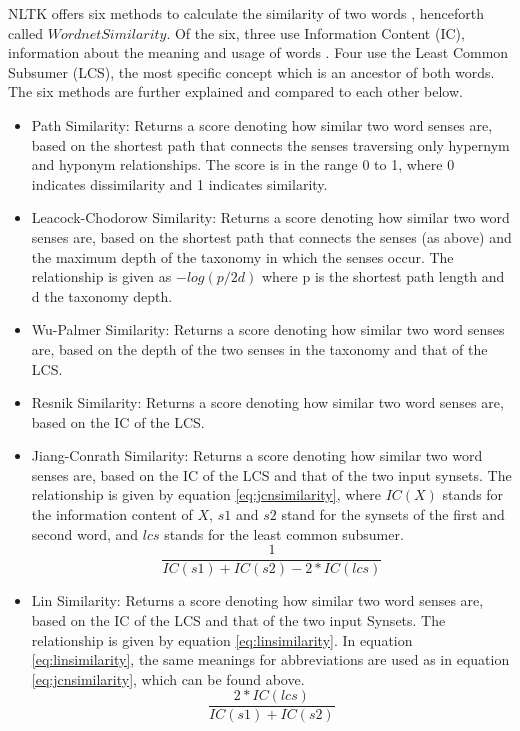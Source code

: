 \documentclass{article}
\begin{document}
NLTK offers six methods to calculate the similarity of two words \citep{pedersen2004wordnet}, henceforth called $\textit{WordnetSimilarity}$. Of the six, three use Information Content (IC), information about the meaning and usage of words \cite{seco2004intrinsic}. Four use the Least Common Subsumer (LCS), the most specific concept which is an ancestor of both words. The six methods are further explained and compared to each other below.
\begin{itemize}
	\item Path Similarity: Returns a score denoting how similar two word senses are, based on the shortest path that connects the senses traversing only hypernym and hyponym relationships. The score is in the range 0 to 1, where 0 indicates dissimilarity and 1 indicates similarity.
	\item Leacock-Chodorow Similarity: Returns a score denoting how similar two word senses are, based on the shortest path that connects the senses (as above) and the maximum depth of the taxonomy in which the senses occur. The relationship is given as \(-log(p/2d)\) where p is the shortest path length and d the taxonomy depth. %
	\item Wu-Palmer Similarity: Returns a score denoting how similar two word senses are, based on the depth of the two senses in the taxonomy and that of the LCS.
	\item Resnik Similarity: Returns a score denoting how similar two word senses are, based on the IC of the LCS.
	\item Jiang-Conrath Similarity: Returns a score denoting how similar two word senses are, based on the IC of the LCS and that of the two input synsets. The relationship is given by equation \ref{eq:jcnsimilarity}, where $IC(X)$ stands for the information content of $X$, $s1$ and $s2$ stand for the synsets of the first and second word, and $lcs$ stands for the least common subsumer.
\begin{equation} \label{eq:jcnsimilarity}
	\frac{1} {IC(s1) + IC(s2) - 2 * IC(lcs)}
\end{equation}
	\item Lin Similarity: Returns a score denoting how similar two word senses are, based on the IC of the LCS and that of the two input Synsets. The relationship is given by equation \ref{eq:linsimilarity}. In equation \ref{eq:linsimilarity}, the same meanings for abbreviations are used as in equation \ref{eq:jcnsimilarity}, which can be found above.
\begin{equation} \label{eq:linsimilarity}
	\frac{2 * IC(lcs)} {IC(s1) + IC(s2)} 
\end{equation} 
\end{itemize}
\end{document}
